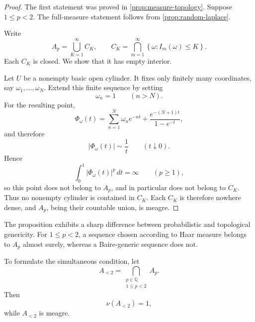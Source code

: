 \documentclass[11pt]{article}
\theoremstyle{remark}
\begin{document}
\begin{proof}
The first statement was proved in
\cref{prop:measure-topology}.  Suppose \(1\leq p<2\).  The full-measure
statement follows from \cref{prop:random-laplace}.

Write
\[
A_p=\bigcup_{K=1}^{\infty}C_K,
\qquad
C_K=
\bigcap_{m=1}^{\infty}
\left\{
\omega:I_m(\omega)\leq K
\right\}.
\]
Each \(C_K\) is closed.  We show that it has empty interior.

Let \(U\) be a nonempty basic open cylinder.  It fixes only finitely
many coordinates, say \(\omega_1,\ldots,\omega_N\).  Extend this finite
sequence by setting
\[
\omega_n=1
\qquad(n>N).
\]
For the resulting point,
\[
\Phi_\omega(t)
=
\sum_{n=1}^{N}\omega_n e^{-nt}
+
\frac{e^{-(N+1)t}}{1-e^{-t}},
\]
and therefore
\[
|\Phi_\omega(t)|\sim\frac1t
\qquad(t\downarrow0).
\]
Hence
\[
\int_0^1|\Phi_\omega(t)|^p\,dt=\infty
\qquad(p\geq1),
\]
so this point does not belong to \(A_p\), and in particular does not
belong to \(C_K\).  Thus no nonempty cylinder is contained in \(C_K\).
Each \(C_K\) is therefore nowhere dense, and \(A_p\), being their
countable union, is meagre.
\end{proof}

The proposition exhibits a sharp difference between probabilistic and
topological genericity.  For \(1\leq p<2\), a sequence chosen according
to Haar measure belongs to \(A_p\) almost surely, whereas a Baire-generic
sequence does not.

To formulate the simultaneous condition, let
\[
A_{<2}
=
\bigcap_{\substack{p\in\mathbb Q\\1\leq p<2}}A_p.
\]
Then
\[
\nu(A_{<2})=1,
\]
while \(A_{<2}\) is meagre.
\end{document}
